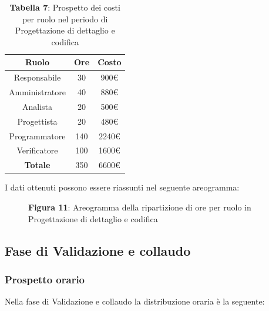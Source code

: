 \begin{table}[H]
	\centering
	\renewcommand{\arraystretch}{1.5}
	\begin{tabular}{|c|c|c|}
		\hline
		\rowcolor{lighter-grayer}
Ruolo & Ore & Costo \\ \hline
Responsabile & 30 & 900\euro \\ \hline
Amministratore & 40 & 880\euro \\ \hline
Analista & 20 & 500\euro \\ \hline
Progettista & 20 & 480\euro \\ \hline
Programmatore & 140 & 2240\euro \\ \hline
Verificatore & 100 & 1600\euro \\ \hline
\textbf{Totale} & 350 & 6600\euro \\ \hline
	\end{tabular}
	\caption*{\textbf{Tabella 7}: Prospetto dei costi per ruolo nel periodo di Progettazione di dettaglio e codifica\\}
\end{table}

I dati ottenuti possono essere riassunti nel seguente areogramma:


\begin{figure}[H]
	\centering
	\caption*{\textbf{Figura 11}: Areogramma della ripartizione di ore per ruolo in Progettazione di dettaglio e codifica}
	\label{fig:Figura10}
\end{figure}

\subsection{Fase di Validazione e collaudo}
\subsubsection{Prospetto orario}
Nella fase di Validazione e collaudo la distribuzione oraria è la seguente:

